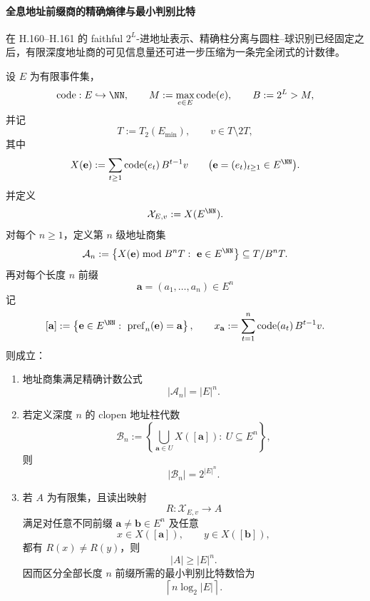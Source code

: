 \paragraph{全息地址前缀商的精确熵律与最小判别比特}
在 H.160--H.161 的 faithful \(2^L\)-进地址表示、精确柱分离与圆柱--球识别已经固定之后，有限深度地址商的可见信息量还可进一步压缩为一条完全闭式的计数律。

\begin{theorem}\label{thm:xi-time-part70ac-hologram-prefix-quotient-entropy-bits}
设 \(E\) 为有限事件集，
\[
\mathrm{code}:E\hookrightarrow \NN,
\qquad
M:=\max_{e\in E}\mathrm{code}(e),
\qquad
B:=2^L>M,
\]
并记
\[
T:=T_2(E_{\min}),
\qquad
v\in T\setminus 2T,
\]
其中
\[
X(\mathbf e):=\sum_{t\ge 1}\mathrm{code}(e_t)\,B^{t-1}v
\qquad
\bigl(\mathbf e=(e_t)_{t\ge 1}\in E^{\NN}\bigr).
\]
并定义
\[
\mathcal X_{E,v}:=X(E^{\NN}).
\]
对每个 \(n\ge 1\)，定义第 \(n\) 级地址商集
\[
\mathcal A_n
:=
\left\{
X(\mathbf e)\bmod B^nT:\ \mathbf e\in E^{\NN}
\right\}
\subseteq T/B^nT.
\]
再对每个长度 \(n\) 前缀
\[
\mathbf a=(a_1,\dots,a_n)\in E^n
\]
记
\[
[\mathbf a]
:=
\left\{
\mathbf e\in E^{\NN}:\ \mathrm{pref}_n(\mathbf e)=\mathbf a
\right\},
\qquad
x_{\mathbf a}
:=
\sum_{t=1}^{n}\mathrm{code}(a_t)\,B^{t-1}v.
\]
则成立：
\begin{enumerate}
  \item 地址商集满足精确计数公式
  \[
  |\mathcal A_n|=|E|^n.
  \]
  \item 若定义深度 \(n\) 的 clopen 地址柱代数
  \[
  \mathcal B_n
  :=
  \left\{
  \bigcup_{\mathbf a\in U}X([\mathbf a]):\ U\subseteq E^n
  \right\},
  \]
  则
  \[
  |\mathcal B_n|=2^{|E|^n}.
  \]
  \item 若 \(A\) 为有限集，且读出映射
  \[
  R:\mathcal X_{E,v}\longrightarrow A
  \]
  满足对任意不同前缀 \(\mathbf a\neq \mathbf b\in E^n\) 及任意
  \[
  x\in X([\mathbf a]),
  \qquad
  y\in X([\mathbf b]),
  \]
  都有 \(R(x)\neq R(y)\)，则
  \[
  |A|\ge |E|^n.
  \]
  因而区分全部长度 \(n\) 前缀所需的最小判别比特数恰为
  \[
  \left\lceil n\log_2|E|\right\rceil.
  \]
\end{enumerate}
\end{theorem}
